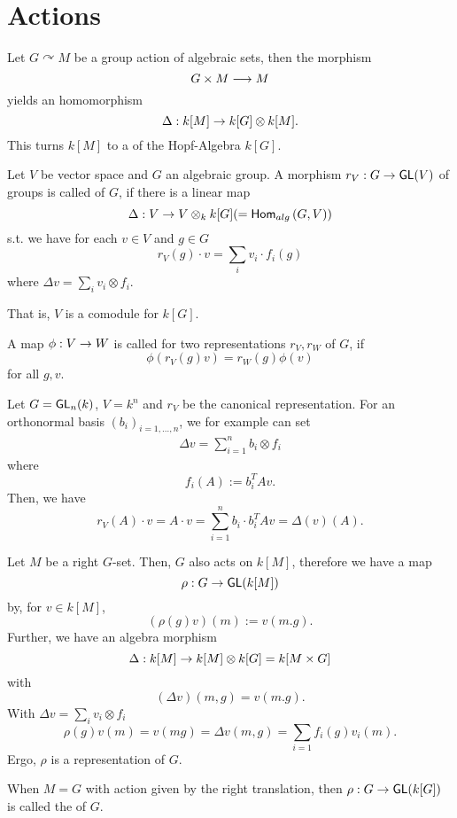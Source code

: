 \section{Actions}

\begin{remark}
	Let $G \curvearrowright M$ be a group action of algebraic sets, then the morphism
	\[ G\times M \overset{}{\longrightarrow} M \]
	yields an homomorphism
	\[ \Delta : k[M] \overset{}{\rightarrow} k[G]\otimes k[M].  \]
	This turns $k[M]$ to a  of the Hopf-Algebra $k[G]$.
\end{remark}

\begin{definition}
	Let $V$ be vector space and $G$ an algebraic group. A morphism $r_V : G \overset{}{\rightarrow} \textsf{GL}(V)$ of groups is called  of $G$, if there is a linear map
	\[ \Delta : V \overset{}{\rightarrow} V \otimes_k k[G] ( = \textsf{Hom}_{alg}\left(G, V\right)) \]
	s.t. we have for each $v \in V$ and $g \in G$
	\[r_V(g)\cdot v = \sum_{i} v_i \cdot  f_i(g)  \]
	where $\Delta v =\sum_{i} v_i \otimes f_i $.
	
	That is, $V$ is a comodule for $k[G]$.
	
	A map $\phi : V \overset{}{\rightarrow} W$ is called  for two representations $r_V, r_W$ of $G$, if
	\[ \phi(r_V(g) v) = r_W(g)\phi(v) \]
	for all $g,v$.
\end{definition}
\begin{example}
	Let $G = \textsf{GL}_n(k)$, $V = k^n$ and $r_V$ be the canonical representation. For an orthonormal basis $(b_i)_{i = 1,\ldots, n}$, we for example can set
	\begin{align*}
	\Delta v = \sum_{i = 1}^n b_i \otimes f_i
	\end{align*}
	where
	\[ f_i(A) := b_i^T A v. \]
	Then, we have 
	\[ r_V(A) \cdot v = A \cdot v = \sum_{i= 1}^nb_i \cdot b_i^T A v = \Delta(v)(A). \]
\end{example}

\begin{example}
	Let $M$ be a right $G$-set. Then, $G$ also acts on $k[M]$, therefore we have a map
	\[ \rho : G \overset{}{\rightarrow} \textsf{GL}(k[M]) \]
	by, for $v \in k[M]$,
	\[ (\rho(g)v)(m) := v(m.g). \]
	Further, we have an algebra morphism
	\[ \Delta : k[M] \overset{}{\rightarrow} k[M] \otimes k[G] = k[M\times G] \]
	with
	\[ (\Delta v) (m, g) = v(m.g). \]
	With $\Delta v = \sum_{i} v_i \otimes f_i$
	\[ \rho(g) v(m) = v(mg) = \Delta v(m, g) = \sum_{i= 1}f_i(g)v_i(m). \]
	Ergo, $\rho$ is a representation of $G$.
	
	
	When $M = G$ with action given by the right translation, then $\rho : G \overset{}{\rightarrow} \textsf{GL}(k[G])$ is called the  of $G$.
\end{example}

